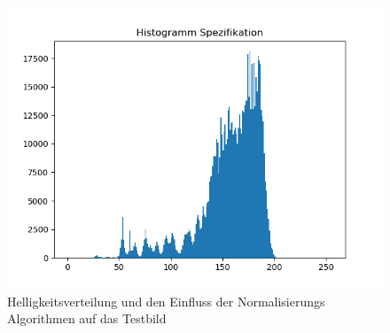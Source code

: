 \begin{appendices}
\begin{figure}[htbp]
\begin{minipage}{0.49\textwidth}
\end{minipage}
\begin{minipage}{0.49\textwidth}
\includegraphics[width=\textwidth]{Sources/Anhang/resize_0250_HS.png}
\end{minipage}
\caption{Helligkeitsverteilung und den Einfluss der Normalisierungs Algorithmen auf das Testbild}
\label{img:hellver}
\end{figure}


\end{appendices}
